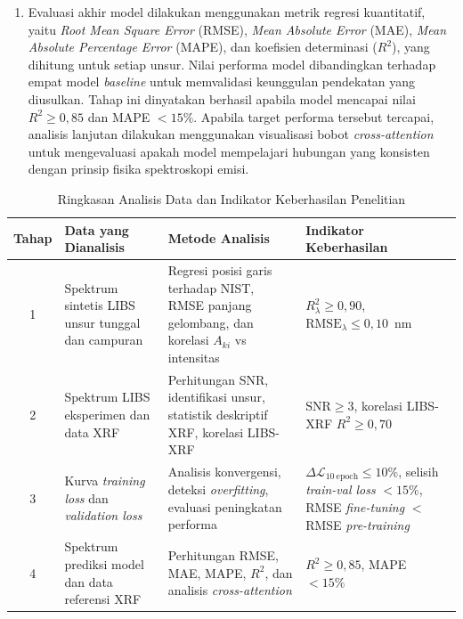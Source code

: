 \begin{enumerate}
    \item Evaluasi akhir model dilakukan menggunakan metrik regresi kuantitatif, yaitu \textit{Root Mean Square Error} (RMSE), \textit{Mean Absolute Error} (MAE), \textit{Mean Absolute Percentage Error} (MAPE), dan koefisien determinasi ($R^2$), yang dihitung untuk setiap unsur. Nilai performa model dibandingkan terhadap empat model \textit{baseline} untuk memvalidasi keunggulan pendekatan yang diusulkan. Tahap ini dinyatakan berhasil apabila model mencapai nilai $R^2 \geq 0{,}85$ dan MAPE $< 15\%$. Apabila target performa tersebut tercapai, analisis lanjutan dilakukan menggunakan visualisasi bobot \textit{cross-attention} untuk mengevaluasi apakah model mempelajari hubungan yang konsisten dengan prinsip fisika spektroskopi emisi.
\end{enumerate}

\begin{table}[htbp]
\centering
\caption{Ringkasan Analisis Data dan Indikator Keberhasilan Penelitian}
\label{tab:analisis_data}
\small
\begin{tabularx}{\textwidth}{|c|X|X|X|}
\hline
\textbf{Tahap} & \textbf{Data yang Dianalisis} & \textbf{Metode Analisis} & \textbf{Indikator Keberhasilan} \\
\hline
1 &
Spektrum sintetis LIBS unsur tunggal dan campuran &
Regresi posisi garis terhadap NIST, RMSE panjang gelombang, dan korelasi $A_{ki}$ vs intensitas &
$R^2_{\lambda} \geq 0{,}90$, $\mathrm{RMSE}_{\lambda} \leq 0{,}10$~nm \\
\hline
2 &
Spektrum LIBS eksperimen dan data XRF &
Perhitungan SNR, identifikasi unsur, statistik deskriptif XRF, korelasi LIBS-XRF &
$\mathrm{SNR} \geq 3$, korelasi LIBS-XRF $R^2 \geq 0{,}70$ \\
\hline
3 &
Kurva \textit{training loss} dan \textit{validation loss} &
Analisis konvergensi, deteksi \textit{overfitting}, evaluasi peningkatan performa &
$\Delta \mathcal{L}_{10\ \text{epoch}} \leq 10\%$, selisih \textit{train-val loss} ${<}15\%$, RMSE \textit{fine-tuning} $<$ RMSE \textit{pre-training} \\
\hline
4 &
Spektrum prediksi model dan data referensi XRF &
Perhitungan RMSE, MAE, MAPE, $R^2$, dan analisis \textit{cross-attention} &
$R^2 \geq 0{,}85$, MAPE $< 15\%$ \\
\hline
\end{tabularx}
\end{table}